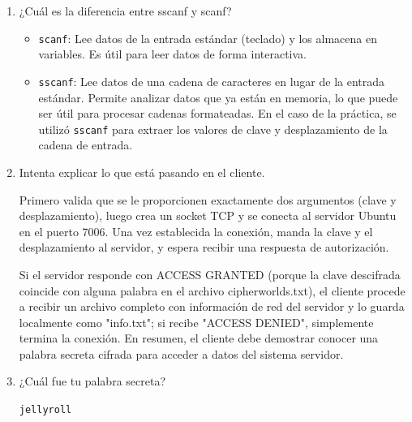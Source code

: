 \documentclass{article}
\begin{document}
\begin{enumerate}
\item ¿Cuál es la diferencia entre sscanf y scanf?
\begin{itemize}
    \item \texttt{scanf}: Lee datos de la entrada estándar (teclado) y los almacena en variables. Es útil para leer datos de forma interactiva.
    \item \texttt{sscanf}: Lee datos de una cadena de caracteres en lugar de la entrada estándar. Permite analizar datos que ya están en memoria, lo que puede ser útil para procesar cadenas formateadas. En el caso de la práctica, se utilizó \texttt{sscanf} para extraer los valores de clave y desplazamiento de la cadena de entrada.
\end{itemize}

\item Intenta explicar lo que está pasando en el cliente.

Primero valida que se le proporcionen exactamente dos argumentos 
(clave y desplazamiento), luego crea un socket TCP y se conecta al servidor Ubuntu 
en el puerto 7006. Una vez establecida la conexión, manda la clave y el desplazamiento 
al servidor, y espera recibir una respuesta de autorización.

Si el servidor responde con ACCESS GRANTED (porque la clave descifrada coincide con alguna 
palabra en el archivo cipherworlds.txt), el cliente procede a recibir un archivo completo con 
información de red del servidor y lo guarda localmente como "info.txt"; si recibe "ACCESS DENIED", 
simplemente termina la conexión. En resumen, el cliente debe demostrar conocer una palabra 
secreta cifrada para acceder a datos del sistema servidor.

\item ¿Cuál fue tu palabra secreta?

\texttt{jellyroll}

\end{enumerate}
\end{document}
